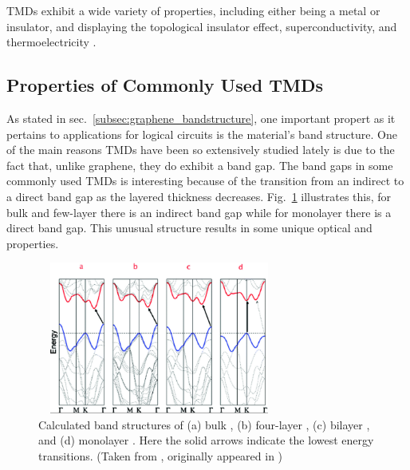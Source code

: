 \noindent TMDs exhibit a wide variety of properties, including either being a metal or insulator, and displaying the topological insulator effect, superconductivity, and thermoelectricity \cite{Lang_ACSnano2012,Zhang_AdvMat2012,Xie_AppPhysLett2009,Gamble_JournChemPhys1975}.

\subsection{Properties of Commonly Used TMDs}\label{subsec:tmd_properties}
\noindent As stated in sec.~\ref{subsec:graphene_bandstructure}, one important propert as it pertains to applications for logical circuits is the material's band structure. One of the main reasons TMDs have been so extensively studied lately is due to the fact that, unlike graphene, they do exhibit a band gap. The band gaps in some commonly used TMDs is interesting because of the transition from an indirect to a direct band gap as the layered thickness decreases. Fig.~\ref{fig:mos2_bandstructure} illustrates this, for bulk and few-layer  there is an indirect band gap while for monolayer  there is a direct band gap. This unusual structure results in some unique optical and properties.
\begin{figure}[ht]
	\centering
	\includegraphics[height=5cm,width=8cm]{figs/mos2_bandstructure}
	\caption[Band structures of ]{Calculated band structures of (a) bulk , (b) four-layer , (c) bilayer , and (d) monolayer . Here the solid arrows indicate the lowest energy transitions. (Taken from \cite{Lee_Nanoscale2014}, originally appeared in \cite{Splendiani_Nanolett2010})}
	\label{fig:mos2_bandstructure}
\end{figure}
 
